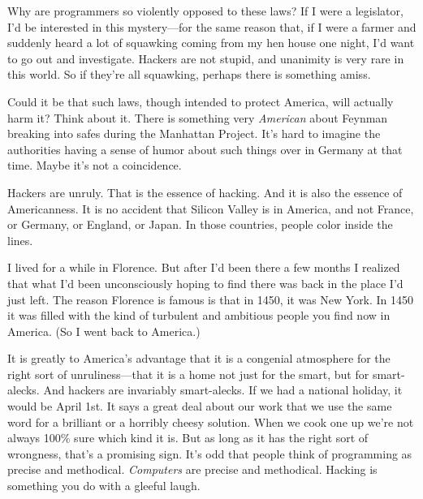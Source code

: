 Why are programmers so
                  violently opposed to these laws? If I were a legislator, I'd
                  be interested in this mystery---for the same reason that,
                  if I were a farmer and suddenly heard a lot of squawking
                  coming from my hen house one night, I'd want to go out and
                  investigate. Hackers are not stupid, and unanimity is very
                  rare in this world. So if they're all squawking, perhaps there
                  is something amiss.

Could it be that such laws,
                  though intended to protect America, will actually harm it?
                  Think about it. There is something very \emph{American} about
                  Feynman breaking into safes during the Manhattan Project. It's
                  hard to imagine the authorities having a sense of humor about
                  such things over in Germany at that time. Maybe it's not a
                  coincidence.

Hackers are unruly. That is the
                  essence of hacking. And it is also the essence of
                  Americanness. It is no accident that Silicon Valley is in
                  America, and not France, or Germany, or England, or Japan. In
                  those countries, people color inside the lines.

I
                  lived for a while in Florence. But after I'd been there a few
                  months I realized that what I'd been unconsciously hoping to
                  find there was back in the place I'd just left. The reason
                  Florence is famous is that in 1450, it was New York. In 1450
                  it was filled with the kind of turbulent and ambitious people
                  you find now in America. (So I went back to America.)

It
                  is greatly to America's advantage that it is a congenial
                  atmosphere for the right sort of unruliness---that it is a
                  home not just for the smart, but for smart-alecks. And hackers
                  are invariably smart-alecks. If we had a national holiday, it
                  would be April 1st. It says a great deal about our work that
                  we use the same word for a brilliant or a horribly cheesy
                  solution. When we cook one up we're not always 100\% sure which
                  kind it is. But as long as it has the right sort of wrongness,
                  that's a promising sign. It's odd that people think of
                  programming as precise and methodical. \emph{Computers} are
                  precise and methodical. Hacking is something you do with a
                  gleeful laugh.

